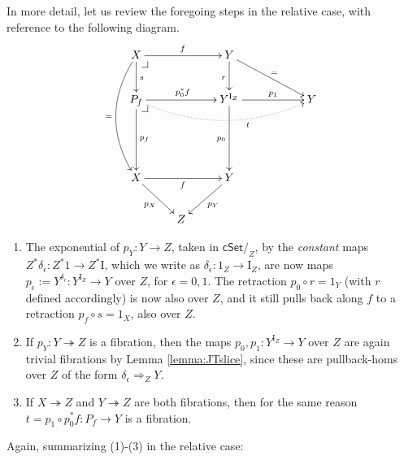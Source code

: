 \documentclass[11pt,reqno]{amsart}
\makeatletter
\newcommand{\cSetZ}{\ensuremath{\mathsf{cSet}/_{\!Z}}}
\newcommand{\ra}{\ensuremath{\rightarrow}}
\newcommand{\fib}{\ensuremath{\twoheadrightarrow}}
\renewcommand{\to}{\ensuremath{\rightarrow}}
\newcommand{\I}{\ensuremath{\mathrm{I}}}
\theoremstyle{remark}
\theoremstyle{definition}
\newcommand{\pbcorner}[1][dr]{\save*!/#1-1.2pc/#1:(-1,1)@^{|-}\restore}
\makeatother
\begin{document}
In more detail, let us review the foregoing steps in the relative case, with reference to the following diagram.
\begin{equation}\label{diag:sliced_pathspace_factorization}
\xymatrix{
X \ar@/_1.5pc/[ddd]_= \ar[d]^s \ar[rr]^f \pbcorner && Y \ar[d]_r \ar[rrd]^=\\
P_f  \ar[dd]^{p_f} \ar[rr]^{p_0^*f} \ar@{.>}@/_1.5pc/[rrrr]_<<<<<<<<<<<<<<<t \pbcorner && Y^{\I_{Z}} \ar[dd]_{p_0} \ar[rr]^-{p_1} && Y \\
\\
X \ar[rd]_{p_X} \ar[rr]_f  && \ar[ld]^{p_Y} Y &\\
& Z &
}
\end{equation}
\begin{enumerate}

\item The exponential of $p_Y : Y\to Z$, taken in $\cSetZ$, by the \emph{constant} maps $Z^*\delta_\epsilon : Z^*1\to Z^*\I$, which we write as $\delta_\epsilon : 1_Z\to \I_Z$, are now maps $p_\epsilon := Y^{\delta_\epsilon} : Y^{\I_{Z}} \to Y$ over $Z$, for $\epsilon = 0,1$.  The retraction $p_0\circ r = 1_Y$ (with $r$ defined accordingly) is now also over $Z$, and it still pulls back along $f$ to a retraction $p_f \circ s =1_X$, also over $Z$.

\item If $p_Y : Y\fib Z$ is a fibration, then the maps $p_0 , p_1 : Y^{\I_Z} \ra Y$ over $Z$ are again trivial fibrations by Lemma \ref{lemma:JTslice}, since these are pullback-homs  over $Z$ of the form $\delta_\epsilon \Rightarrow_Z Y$. 
%

\item If $X\fib Z$ and $Y\fib Z$ are both fibrations, then for the same reason $t= p_1\circ p_0^*f : P_f \ra Y$ is a fibration. 
%
\end{enumerate}

Again, summarizing (1)-(3) in the relative case:
\end{document}
